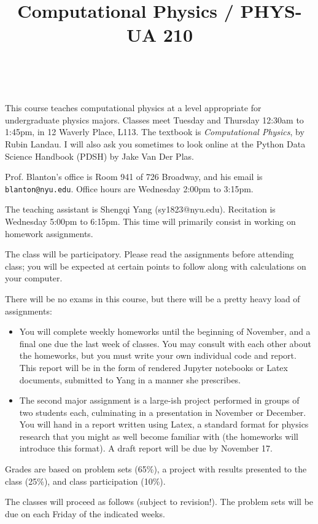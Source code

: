 \documentclass[11pt, preprint]{aastex}
\begin{document}
\title{\bf Computational Physics / PHYS-UA 210}
~
~

\noindent This course teaches computational physics at a level
appropriate for undergraduate physics majors.  Classes meet Tuesday
and Thursday 12:30am to 1:45pm, in 12 Waverly Place, L113.  The
textbook is {\it Computational Physics}, by Rubin Landau. I will also
ask you sometimes to look online at the Python Data Science Handbook
(PDSH) by Jake Van Der Plas.

\noindent Prof. Blanton's office is Room 941 of 726 Broadway, and his
email is {\tt blanton@nyu.edu}.  Office hours are Wednesday 2:00pm to
3:15pm.

\noindent The teaching assistant is Shengqi Yang
(sy1823@nyu.edu). Recitation is Wednesday 5:00pm to 6:15pm. This time
will primarily consist in working on homework assignments.

\noindent The class will be participatory. Please read the assignments
before attending class; you will be expected at certain points to
follow along with calculations on your computer.

\noindent There will be no exams in this course, but there will be a
pretty heavy load of assignments:
\begin{itemize}
\item You will complete weekly homeworks until the beginning of
  November, and a final one due the last week of classes. You may
  consult with each other about the homeworks, but you must write your
  own individual code and report. This report will be in the form of
  rendered Jupyter notebooks or Latex documents, submitted to Yang in
  a manner she prescribes.
\item The second major assignment is a large-ish project performed in
  groups of two students each, culminating in a presentation in
  November or December. You will hand in a report written using Latex,
  a standard format for physics research that you might as well become
  familiar with (the homeworks will introduce this format). A draft
  report will be due by November 17.
\end{itemize}

\noindent Grades are based on problem sets (65\%), a project with
results presented to the class (25\%), and class participation (10\%).

\noindent The classes will proceed as follows (subject to revision!).
The problem sets will be due on each Friday of the indicated weeks.
\end{document}
